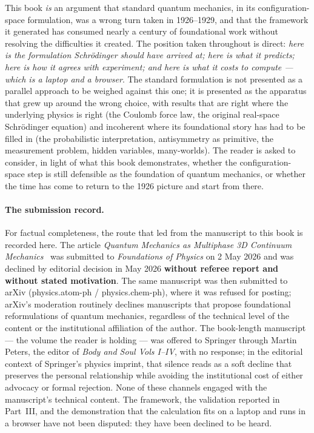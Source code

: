 This book \emph{is} an argument that standard quantum mechanics, in its configuration-space formulation, was a wrong turn taken in 1926--1929, and that the framework it generated has consumed nearly a century of foundational work without resolving the difficulties it created. The position taken throughout is direct: \emph{here is the formulation Schr\"odinger should have arrived at; here is what it predicts; here is how it agrees with experiment; and here is what it costs to compute --- which is a laptop and a browser}. The standard formulation is not presented as a parallel approach to be weighed against this one; it is presented as the apparatus that grew up around the wrong choice, with results that are right where the underlying physics is right (the Coulomb force law, the original real-space Schr\"odinger equation) and incoherent where its foundational story has had to be filled in (the probabilistic interpretation, antisymmetry as primitive, the measurement problem, hidden variables, many-worlds). The reader is asked to consider, in light of what this book demonstrates, whether the configuration-space step is still defensible as the foundation of quantum mechanics, or whether the time has come to return to the 1926 picture and start from there.

\paragraph{The submission record.}
For factual completeness, the route that led from the manuscript to this book is recorded here. The article \emph{Quantum Mechanics as Multiphase 3D Continuum Mechanics}~\cite{Johnson2026FoP} was submitted to \emph{Foundations of Physics} on 2 May 2026 and was declined by editorial decision in May 2026 \textbf{without referee report and without stated motivation}. The same manuscript was then submitted to arXiv (physics.atom-ph / physics.chem-ph), where it was refused for posting; arXiv's moderation routinely declines manuscripts that propose foundational reformulations of quantum mechanics, regardless of the technical level of the content or the institutional affiliation of the author. The book-length manuscript --- the volume the reader is holding --- was offered to Springer through Martin Peters, the editor of \emph{Body and Soul Vols I--IV}, with no response; in the editorial context of Springer's physics imprint, that silence reads as a soft decline that preserves the personal relationship while avoiding the institutional cost of either advocacy or formal rejection. None of these channels engaged with the manuscript's technical content. The framework, the validation reported in Part~III, and the demonstration that the calculation fits on a laptop and runs in a browser have not been disputed: they have been declined to be heard.

